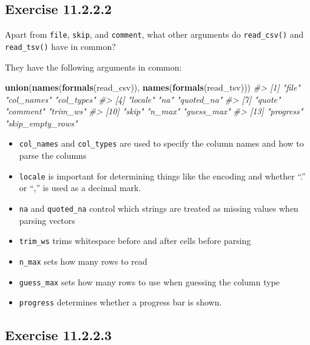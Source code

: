 \documentclass[]{book}
\newenvironment{Shaded}{\begin{snugshade}}{\end{snugshade}}
\newcommand{\CommentTok}[1]{\textcolor[rgb]{0.56,0.35,0.01}{\textit{#1}}}
\newcommand{\KeywordTok}[1]{\textcolor[rgb]{0.13,0.29,0.53}{\textbf{#1}}}
\newcommand{\NormalTok}[1]{#1}
\providecommand{\tightlist}{%
  \setlength{\itemsep}{0pt}\setlength{\parskip}{0pt}}
\theoremstyle{plain}
\theoremstyle{remark}
\begin{document}
\hypertarget{exercise-11.2.2.2}{%
\subsection*{\texorpdfstring{Exercise {11.2.2.2}}{Exercise 11.2.2.2}}\label{exercise-11.2.2.2}}

Apart from \texttt{file}, \texttt{skip}, and \texttt{comment}, what other arguments do \texttt{read\_csv()} and \texttt{read\_tsv()} have in common?

They have the following arguments in common:

\begin{Shaded}
\begin{Highlighting}[]
\KeywordTok{union}\NormalTok{(}\KeywordTok{names}\NormalTok{(}\KeywordTok{formals}\NormalTok{(read_csv)), }\KeywordTok{names}\NormalTok{(}\KeywordTok{formals}\NormalTok{(read_tsv)))}
\CommentTok{#>  [1] "file"            "col_names"       "col_types"      }
\CommentTok{#>  [4] "locale"          "na"              "quoted_na"      }
\CommentTok{#>  [7] "quote"           "comment"         "trim_ws"        }
\CommentTok{#> [10] "skip"            "n_max"           "guess_max"      }
\CommentTok{#> [13] "progress"        "skip_empty_rows"}
\end{Highlighting}
\end{Shaded}

\begin{itemize}
\tightlist
\item
  \texttt{col\_names} and \texttt{col\_types} are used to specify the column names and how to parse the columns
\item
  \texttt{locale} is important for determining things like the encoding and whether ``.'' or ``,'' is used as a decimal mark.
\item
  \texttt{na} and \texttt{quoted\_na} control which strings are treated as missing values when parsing vectors
\item
  \texttt{trim\_ws} trims whitespace before and after cells before parsing
\item
  \texttt{n\_max} sets how many rows to read
\item
  \texttt{guess\_max} sets how many rows to use when guessing the column type
\item
  \texttt{progress} determines whether a progress bar is shown.
\end{itemize}

\hypertarget{exercise-11.2.2.3}{%
\subsection*{\texorpdfstring{Exercise {11.2.2.3}}{Exercise 11.2.2.3}}\label{exercise-11.2.2.3}}
\end{document}
